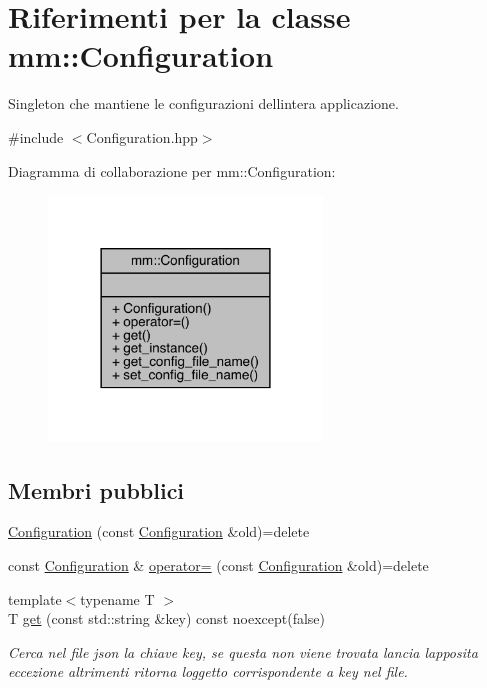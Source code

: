 \hypertarget{classmm_1_1_configuration}{}\section{Riferimenti per la classe mm\+:\+:Configuration}
\label{classmm_1_1_configuration}


Singleton che mantiene le configurazioni dell\textquotesingle{}intera applicazione.  




{\ttfamily \#include $<$Configuration.\+hpp$>$}



Diagramma di collaborazione per mm\+:\+:Configuration\+:
\nopagebreak
\begin{figure}[H]
\begin{center}
\leavevmode
\includegraphics[width=206pt]{dc/d7c/classmm_1_1_configuration__coll__graph}
\end{center}
\end{figure}
\subsection*{Membri pubblici}
\begin{DoxyCompactItemize}
\item 
\mbox{\hyperlink{classmm_1_1_configuration_a71e5c0e1ad7d82d6a14895a4e85d83b7}{Configuration}} (const \mbox{\hyperlink{classmm_1_1_configuration}{Configuration}} \&old)=delete
\item 
const \mbox{\hyperlink{classmm_1_1_configuration}{Configuration}} \& \mbox{\hyperlink{classmm_1_1_configuration_a3077aebf459758dce4be716a8ddcb090}{operator=}} (const \mbox{\hyperlink{classmm_1_1_configuration}{Configuration}} \&old)=delete
\item 
{\footnotesize template$<$typename T $>$ }\\T \mbox{\hyperlink{classmm_1_1_configuration_a30374c407050b9fb3f05dd3c2c01202d}{get}} (const std\+::string \&key) const noexcept(false)
\begin{DoxyCompactList}\small\item\em Cerca nel file json la chiave {\ttfamily key}, se questa non viene trovata lancia l\textquotesingle{}apposita eccezione altrimenti ritorna l\textquotesingle{}oggetto corrispondente a {\ttfamily key} nel file. \end{DoxyCompactList}\end{DoxyCompactItemize}
